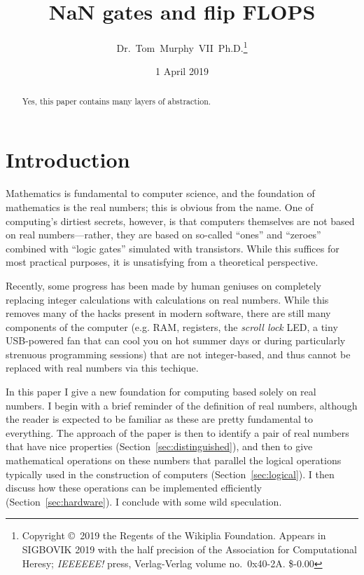 \documentclass[twocolumn,cm]{article}
\begin{document}
 

\newcommand\ieee[2]{[{\it IEEE 754-2008}, #1, p#2]}

\title{NaN gates and flip FLOPS}
\author{Dr.~Tom~Murphy~VII~Ph.D.\footnote{
Copyright \copyright\ 2019 the Regents of the Wikiplia
Foundation. Appears in SIGBOVIK 2019 with the
half precision
of the Association for Computational Heresy; 
{\em IEEEEEE!} press, Verlag-Verlag volume no.~0x40-2A.
\$-0.00 } }

\renewcommand\th{\ensuremath{{}^{\textrm{th}}}}
\newcommand\st{\ensuremath{{}^{\textrm{st}}}}
\newcommand\rd{\ensuremath{{}^{\textrm{rd}}}}
\newcommand\nd{\ensuremath{{}^{\textrm{nd}}}}
\newcommand\at{\ensuremath{\scriptstyle @}}

\date{1 April 2019}

\maketitle \thispagestyle{empty}

\begin{abstract}
Yes, this paper contains many layers of abstraction.
\end{abstract}

\section*{Introduction}

Mathematics is fundamental to computer science, and the foundation of
mathematics is the real numbers; this is obvious from the name. One of
computing's dirtiest secrets, however, is that computers themselves
are not based on real numbers---rather, they are based on so-called
``ones'' and ``zeroes'' combined with ``logic gates'' simulated with
transistors. While this suffices for most practical purposes, it is
unsatisfying from a theoretical perspective.

Recently, some progress has been made by human geniuses on completely
replacing integer calculations with calculations on real
numbers\cite{fluint8}. While this removes many of the hacks present in
modern software, there are still many components of the computer (e.g.
RAM, registers, the {\it scroll lock} LED, a tiny USB-powered fan that
can cool you on hot summer days or during particularly strenuous
programming sessions) %
that are not integer-based, and thus cannot be replaced with real numbers
via this techique.

In this paper I give a new foundation for computing based solely on
real numbers. I begin with a brief reminder of the definition of real
numbers, although the reader is expected to be familiar as these are
pretty fundamental to everything. The approach of the paper is then to
identify a pair of real numbers that have nice properties
(Section~\ref{sec:distinguished}), and then to give mathematical
operations on these numbers that parallel the logical operations
typically used in the construction of computers
(Section~\ref{sec:logical}). I then discuss how these operations can
be implemented efficiently (Section~\ref{sec:hardware}). I
conclude with some wild speculation.
\end{document}
